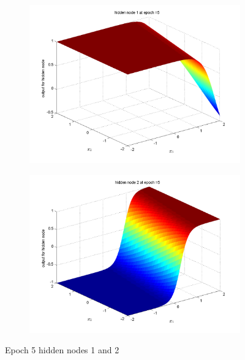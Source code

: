 \documentclass{article}
\begin{document}
\begin{figure}
\begin{subfigure}{.5\textwidth}
  \centering
  \includegraphics[width=.8\linewidth]{Classification/nonlinearlySeparable/h5_1}
 
\end{subfigure}%
\begin{subfigure}{.5\textwidth}
  \centering
  \includegraphics[width=.8\linewidth]{Classification/nonlinearlySeparable/h5_2}
  \end{subfigure}
\caption{Epoch 5 hidden nodes 1 and 2}
\end{figure}
\end{document}

